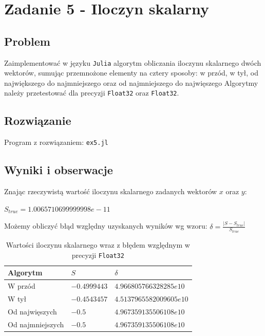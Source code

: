 \documentclass[12pt]{article}
\begin{document}
\newpage

\section*{Zadanie 5 - Iloczyn skalarny}
    \subsection*{Problem}
        Zaimplementować w języku \texttt{Julia} algorytm obliczania iloczynu skalarnego dwóch wektorów,
        sumując przemnożone elementy na cztery sposoby: w przód, w tył, od największego do najmniejszego oraz od najmniejszego do najwięszego
        \noindent Algorytmy należy przetestować dla precyzji \texttt{Float32} oraz \texttt{Float32}.
        \newline

    \subsection*{Rozwiązanie}
        Program z rozwiązaniem: \texttt{ex5.jl}
        \newline

    \subsection*{Wyniki i obserwacje}
        Znając rzeczywistą wartość iloczynu skalarnego zadanych wektorów $x$ oraz $y$:
        \begin{center}
        \begin{math}
            S_{true} = 1.0065710699999998e-11
        \end{math}
        \end{center}
        Możemy obliczyć błąd względny uzyskanych wyników wg wzoru: $\delta = \frac{|S - S_{true}|}{S_{true}}$
        \newline

        \begin{table}[h!]
            \centering
            \begin{tabularx}{0.67\textwidth}{l l l}
                \hline
                Algorytm & $S$ & $\delta$ \\
                \hline
                W przód & $-0.4999443$ & $4.966805766328285e10$ \\
                W tył & $-0.4543457$ & $4.5137965582009605e10$ \\
                Od najwięszych & $-0.5$ & $4.967359135506108e10$ \\
                Od najmniejszych & $-0.5$ & $4.967359135506108e10$ \\
                \hline
            \end{tabularx}
            \caption{Wartości iloczynu skalarnego wraz z błędem względnym w precyzji \texttt{Float32}}
            \label{table:dot_prod_32}
        \end{table}
\end{document}
